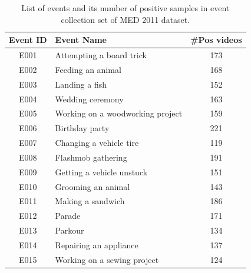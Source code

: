 \begin{table}[!h]
	\renewcommand{\arraystretch}{1.3}
	\centering
	\caption{List of events and its number of positive samples in event collection set of MED 2011 dataset.}
	\begin{tabular}{|c|l|c|}
		\toprule
		Event ID & Event Name & \#Pos videos \\
		\midrule
		E001  & Attempting a board trick & 173 \\
		\midrule
		E002  & Feeding an animal & 168 \\
		\midrule
		E003  & Landing a fish & 152 \\
		\midrule
		E004  & Wedding ceremony & 163 \\
		\midrule
		E005  & Working on a woodworking project & 159 \\
		\midrule
		E006  & Birthday party & 221 \\
		\midrule
		E007  & Changing a vehicle tire & 119 \\
		\midrule
		E008  & Flashmob gathering & 191 \\
		\midrule
		E009  & Getting a vehicle unstuck & 151 \\
		\midrule
		E010  & Grooming an animal & 143 \\
		\midrule
		E011  & Making a sandwich & 186 \\
		\midrule
		E012  & Parade & 171 \\
		\midrule
		E013  & Parkour & 134 \\
		\midrule
		E014  & Repairing an appliance & 137 \\
		\midrule
		E015  & Working on a sewing project & 124 \\
		\bottomrule
	\end{tabular}%
	\label{med11}%
\end{table}%

